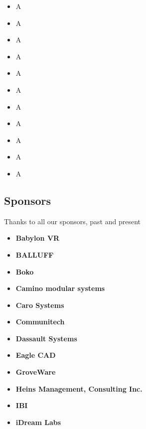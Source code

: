\documentclass[main.tex]{subfiles}
\begin{document}
\begin{multicols}{4}
\begin{itemize}[label={},noitemsep]
     \item {A}
	 \item {A}
     \item {A}
	 \item {A}
     \item {A}
	 \item {A}
     \item {A}
	 \item {A}
     \item {A}
	 \item {A}
  	 \item {A}
\end{itemize}
\end{multicols}

\begin{flushleft}
\subsection{Sponsors}
Thanks to all our sponsors, past and present

\begin{multicols}{3}
    \begin{itemize}[label={},noitemsep]
    \item \textbf{Babylon VR}
    \item \textbf{BALLUFF}
    \item \textbf{Boko}
    \end{itemize}
\end{multicols}

\begin{multicols}{3}
\begin{itemize}[label={},noitemsep]
    \item \textbf{Camino modular systems}
    \item \textbf{Caro Systems}
    \item \textbf{Communitech}
    \end{itemize}
\end{multicols}

\begin{multicols}{3}
\begin{itemize}[label={},noitemsep]
    \item \textbf{Dassault Systems}
    \item \textbf{Eagle CAD}
    \item \textbf{GroveWare}
    \end{itemize}
\end{multicols}

\begin{multicols}{3}
\begin{itemize}[label={},noitemsep]
    \item \textbf{Heins Management, Consulting Inc.}
    \item \textbf{IBI}
    \item \textbf{iDream Labs}
    \end{itemize}
\end{multicols}


\end{flushleft}
\end{document}
